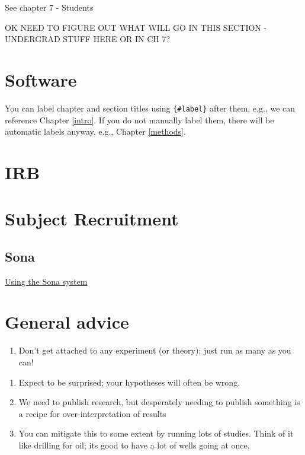 \documentclass[
]{book}
\providecommand{\tightlist}{%
  \setlength{\itemsep}{0pt}\setlength{\parskip}{0pt}}
\begin{document}
See chapter 7 - Students

OK NEED TO FIGURE OUT WHAT WILL GO IN THIS SECTION - UNDERGRAD STUFF HERE OR IN CH 7?

\hypertarget{software}{%
\section{Software}\label{software}}

You can label chapter and section titles using \texttt{\{\#label\}} after them, e.g., we can reference Chapter \ref{intro}. If you do not manually label them, there will be automatic labels anyway, e.g., Chapter \ref{methods}.

\hypertarget{irb}{%
\section{IRB}\label{irb}}

\hypertarget{subject-recruitment}{%
\section{Subject Recruitment}\label{subject-recruitment}}

\hypertarget{sona}{%
\subsection{Sona}\label{sona}}

\href{docs/resources/SONA\%20new\%20studies\%20guide.pdf}{Using the Sona system}

\hypertarget{general-advice}{%
\section{General advice}\label{general-advice}}

\begin{enumerate}
\def\labelenumi{\arabic{enumi}.}
\tightlist
\item
  Don't get attached to any experiment (or theory); just run as many as you can!
\end{enumerate}

\begin{enumerate}
\def\labelenumi{\roman{enumi})}
\tightlist
\item
  Expect to be surprised; your hypotheses will often be wrong.
\item
  We need to publish research, but desperately needing to publish something is a recipe
  for over-interpretation of results
\item
  You can mitigate this to some extent by running lots of studies. Think of it like
  drilling for oil; its good to have a lot of wells going at once.
\end{enumerate}
\end{document}
